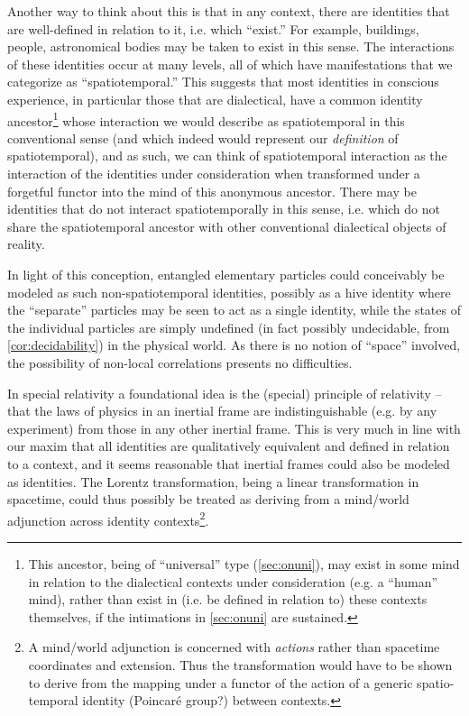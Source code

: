 \documentclass[pra,twocolumn,groupedaddress,10pt]{revtex4}
\theoremstyle{definition}
\begin{document}
Another way to think about this is that in any context, there are identities that are well-defined in relation to it, i.e. which ``exist.'' For example, buildings, people, astronomical bodies may be taken to exist in this sense. The interactions of these identities occur at many levels, all of which have manifestations that we categorize as ``spatiotemporal.'' This suggests that most identities in conscious experience, in particular those that are dialectical, have a common identity ancestor\footnote{This ancestor, being of ``universal'' type (\autoref{sec:onuni}), may exist in some mind in relation to the dialectical contexts under consideration (e.g. a ``human'' mind), rather than exist in (i.e. be defined in relation to) these contexts themselves, if the intimations in \autoref{sec:onuni} are sustained.} whose interaction we would describe as spatiotemporal in this conventional sense (and which indeed would represent our \textit{definition} of spatiotemporal), and as such, we can think of spatiotemporal interaction as the interaction of the identities under consideration when transformed under a forgetful functor into the mind of this anonymous ancestor. There may be identities that do not interact spatiotemporally in this sense, i.e. which do not share the spatiotemporal ancestor with other conventional dialectical objects of reality.

In light of this conception, entangled elementary particles could conceivably be modeled as such non-spatiotemporal identities, possibly as a hive identity where the ``separate'' particles may be seen to act as a single identity, while the states of the individual particles are simply undefined (in fact possibly undecidable, from \autoref{cor:decidability}) in the physical world. As there is no notion of ``space'' involved, the possibility of non-local correlations presents no difficulties.

In special relativity a foundational idea is the (special) principle of relativity -- that the laws of physics in an inertial frame are indistinguishable (e.g. by any experiment) from those in any other inertial frame. This is very much in line with our maxim that all identities are qualitatively equivalent and defined in relation to a context, and it seems reasonable that inertial frames could also be modeled as identities. The Lorentz transformation, being a linear transformation in spacetime, could thus possibly be treated as deriving from a mind/world adjunction across identity contexts\footnote{A mind/world adjunction is concerned with \emph{actions} rather than spacetime coordinates and extension. Thus the transformation would have to be shown to derive from the mapping under a functor of the action of a generic spatio-temporal identity (Poincar\'{e} group?) between contexts.}.
\end{document}
